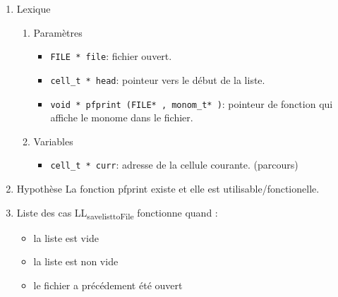 \documentclass[11pt]{article}
\begin{document}
\begin{enumerate}
\item Lexique
\label{sec:org0658497}
\begin{enumerate}
\item Paramètres
\label{sec:orgdd23e93}
\begin{itemize}
\item \texttt{FILE * file}: fichier ouvert.
\item \texttt{cell\_t * head}: pointeur vers le début de la liste.
\item \texttt{void * pfprint (FILE* , monom\_t* )}: pointeur de fonction qui affiche le monome dans le fichier.
\end{itemize}
\item Variables
\label{sec:org7591d8f}
\begin{itemize}
\item \texttt{cell\_t * curr}: adresse de la cellule courante. (parcours)
\end{itemize}
\end{enumerate}

\item Hypothèse
\label{sec:org14346e0}
La fonction pfprint existe et elle est utilisable/fonctionelle.
\item Liste des cas
\label{sec:orgf9b5e83}
LL\textsubscript{save}\textsubscript{list}\textsubscript{toFile} fonctionne quand :
\begin{itemize}
\item la liste est vide
\item la liste est non vide
\item le fichier a précédement été ouvert
\end{itemize}
\end{enumerate}
\end{document}
